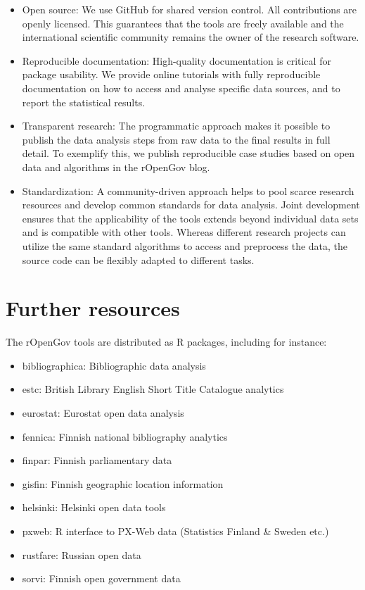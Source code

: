 \documentclass{article}\usepackage[]{graphicx}\usepackage[]{color}
\begin{document}
\begin{itemize}

\item Open source: We use GitHub for shared version control. All
  contributions are openly licensed. This guarantees that the tools
  are freely available and the international scientific community
  remains the owner of the research software.

\item Reproducible documentation: High-quality documentation is critical
  for package usability. We provide online tutorials with fully
  reproducible documentation on how to access and analyse specific
  data sources, and to report the statistical results.

\item Transparent research: The programmatic approach makes it possible to
  publish the data analysis steps from raw data to the final results
  in full detail. To exemplify this, we publish reproducible case
  studies based on open data and algorithms in the rOpenGov blog.

\item Standardization: A community-driven approach helps to pool scarce
  research resources and develop common standards for data
  analysis. Joint development ensures that the applicability of the
  tools extends beyond individual data sets and is compatible with
  other tools. Whereas different research projects can utilize the
  same standard algorithms to access and preprocess the data, the
  source code can be flexibly adapted to different tasks.

\end{itemize}


\section{Further resources}

The rOpenGov tools are distributed as R packages, including for
instance:

\begin{itemize}
 \item bibliographica: Bibliographic data analysis
 \item estc: British Library English Short Title Catalogue analytics
 \item eurostat: Eurostat open data analysis
 \item fennica: Finnish national bibliography analytics
 \item finpar: Finnish parliamentary data
 \item gisfin: Finnish geographic location information
 \item helsinki: Helsinki open data tools
 \item pxweb: R interface to PX-Web data (Statistics Finland \& Sweden etc.)
 \item rustfare: Russian open data
 \item sorvi: Finnish open government data
\end{itemize}
\end{document}
